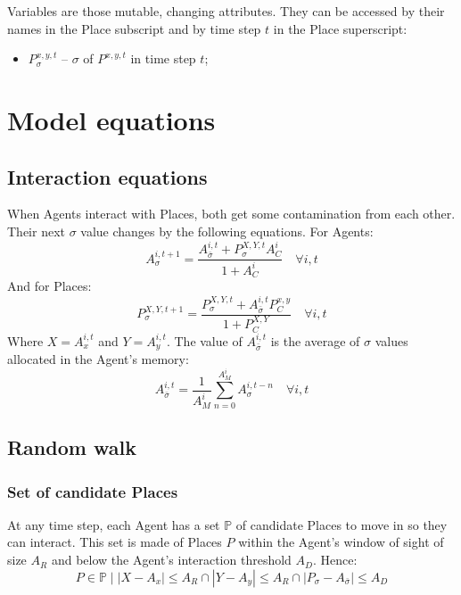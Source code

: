 \documentclass{article}
\begin{document}
\par Variables are those mutable, changing attributes. They can be accessed by their names in the Place subscript and by time step $t$ in the Place superscript: 

\begin{itemize}
    \item $P^{x,y,t}_{\sigma}$ -- $\sigma$ of $P^{x,y,t}$ in time step $t$;
\end{itemize}

\section{Model equations}

\subsection{Interaction equations}

\par When Agents interact with Places, both get some contamination from each other. Their next $\sigma$ value changes by the following equations. For Agents:  
\begin{equation}
    A^{i,t + 1}_{\sigma} = \frac{A^{i, t}_{\bar{\sigma}} + P^{X,Y,t}_{\sigma} A^{i}_{C}}{1 + A^{i}_{C}} \quad \forall i, t
\end{equation}
And for Places:
\begin{equation}
    P^{X,Y,t + 1}_{\sigma} = \frac{P^{X,Y,t}_{\sigma} + A^{i, t}_{\bar{\sigma}} P^{x,y}_{C}}{1 + P^{X,Y}_{C}} \quad \forall i, t
\end{equation}
Where $X = A^{i,t}_{x}$ and $Y = A^{i,t}_{y}$. The value of $A^{i, t}_{\bar{\sigma}}$ is the average of $\sigma$ values allocated in the Agent's memory:
\begin{equation}
    A^{i, t}_{\bar{\sigma}} = \frac{1}{A^{i}_{M}} \sum_{n=0}^{A^{i}_{M}} A^{i, t - n}_{\sigma} \quad \forall i, t
\end{equation}

\subsection{Random walk}

\subsubsection{Set of candidate Places}

\par At any time step, each Agent has a set $\mathbb{P}$ of candidate Places to move in so they can interact. This set is made of Places $P$ within the Agent's window of sight of size $A_{R}$ and below the Agent's interaction threshold $A_{D}$. Hence:
\begin{equation}
    P \in \mathbb{P} \;\big|\;|X - A_{x}| \leq A_{R} \cap |Y - A_{y}| \leq A_{R} \cap |P_{\sigma} - A_{\bar{\sigma}}| \leq A_{D} 
\end{equation}
\end{document}

